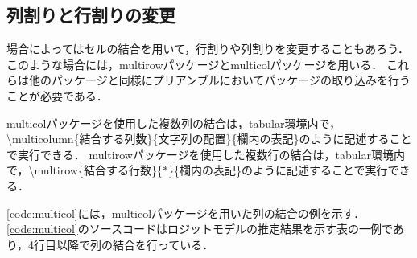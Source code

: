 

\subsection{列割りと行割りの変更}

場合によってはセルの結合を用いて，行割りや列割りを変更することもあろう．
このような場合には，multirowパッケージとmulticolパッケージを用いる．
これらは他のパッケージと同様にプリアンブルにおいてパッケージの取り込みを行うことが必要である．

multicolパッケージを使用した複数列の結合は，tabular環境内で，\textbackslash multicolumn\{結合する列数\}\{文字列の配置\}\{欄内の表記\}のように記述することで実行できる．
multirowパッケージを使用した複数行の結合は，tabular環境内で，\textbackslash multirow\{結合する行数\}\{$\ast$\}\{欄内の表記\}のように記述することで実行できる．

\code\ref{code:multicol}には，multicolパッケージを用いた列の結合の例を示す．
\code\ref{code:multicol}のソースコードはロジットモデルの推定結果を示す表の一例であり，4行目以降で列の結合を行っている．

